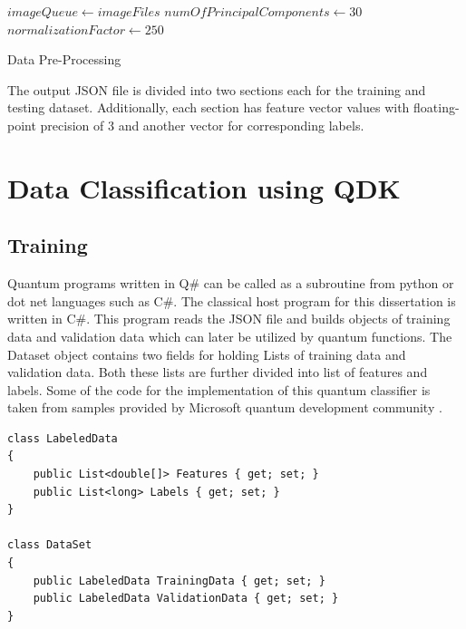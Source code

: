 \documentclass[english,a4paper,11pt,oneside,onecolumn]{book}
\begin{document}
\begin{algorithm}
	\SetAlgoLined
	 $imageQueue \gets imageFiles$\;
	 $numOfPrincipalComponents \gets 30$\;
	 $normalizationFactor \gets 250$\;
	\caption{Data Pre-Processing}
	\label{algo:1}
\end{algorithm}

The output JSON file is divided into two sections each for the training and testing dataset. Additionally, each section has feature vector values with floating-point precision of 3 and another vector for corresponding labels. 

\section{Data Classification using QDK}
\label{sec:qClassifier}

\subsection{Training}

Quantum programs written in Q\# can be called as a subroutine from python or dot net languages such as C\#. The classical host program for this dissertation is written in C\#. This program reads the JSON file and builds objects of training data and validation data which can later be utilized by quantum functions. The Dataset object contains two fields for holding Lists of training data and validation data. Both these lists are further divided into list of features and labels. Some of the code for the implementation of this quantum classifier is taken from samples provided by Microsoft quantum development community \cite{mykhailova_2020_microsoftquantumkatas, granade_2020_microsoftquantum}.

\begin{lstlisting}[caption={C\# Data Objects}]
class LabeledData
{
    public List<double[]> Features { get; set; }
    public List<long> Labels { get; set; }
}

class DataSet
{
    public LabeledData TrainingData { get; set; }
    public LabeledData ValidationData { get; set; }
}
\end{lstlisting}
\end{document}
